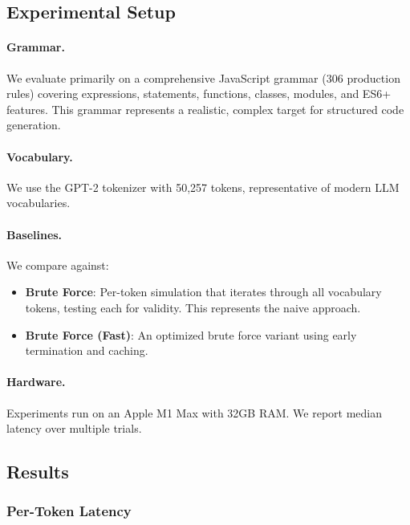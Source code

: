\documentclass[11pt,a4paper]{article}
\theoremstyle{plain}
\theoremstyle{definition}
\theoremstyle{remark}
\begin{document}
\subsection{Experimental Setup}

\paragraph{Grammar.} We evaluate primarily on a comprehensive JavaScript grammar (306 production rules) covering expressions, statements, functions, classes, modules, and ES6+ features. This grammar represents a realistic, complex target for structured code generation.

\paragraph{Vocabulary.} We use the GPT-2 tokenizer with 50,257 tokens, representative of modern LLM vocabularies.

\paragraph{Baselines.} We compare against:
\begin{itemize}
\item \textbf{Brute Force}: Per-token simulation that iterates through all vocabulary tokens, testing each for validity. This represents the naive approach.
\item \textbf{Brute Force (Fast)}: An optimized brute force variant using early termination and caching.
\end{itemize}

\paragraph{Hardware.} Experiments run on an Apple M1 Max with 32GB RAM. We report median latency over multiple trials.

\subsection{Results}

\subsubsection{Per-Token Latency}
\end{document}
